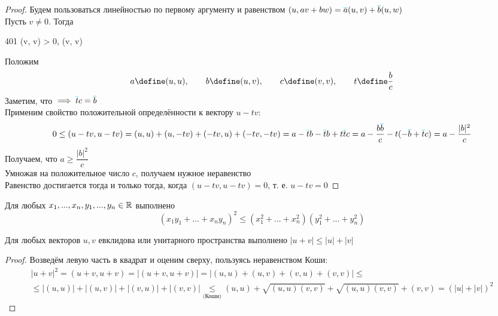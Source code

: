 \begin{proof}
	Будем пользоваться линейностью по первому аргументу и равенством $ (u, av + bw) = \color{cyan}\overline{\color{black}a}\color{black}(u, v) + \color{cyan}\overline{\color{black}b}\color{black}(u, w) $ \\
	Пусть $ v \ne 0 $. Тогда
	\begin{equ}{401}
		(v, v) > 0, \qquad (v, v) \in \R
	\end{equ}
	Положим
	$$ a \define (u, u), \qquad b \define (u, v), \qquad c \define (v, v), \qquad t \define \frac{b}{c} $$
	Заметим, что  $ \implies \color{cyan}\overline{\color{black}t}\color{black}c = \color{cyan}\overline{\color{black}b}\color{black} $ \\
	Применим свойство положительной определённости к вектору $ u - tv $:
	$$ 0 \le (u - tv, u - tv) = (u, u) + (u, -tv) + (-tv, u) + (-tv, -tv) = a - \color{cyan}\overline{\color{black}t}\color{black}b - \color{cyan}\overline{\color{black}t}\color{black}b + t\color{cyan}\overline{\color{black}t}\color{black}c = a - \frac{b\color{cyan}\overline{\color{black}b}\color{black}}c - t(-\color{cyan}\overline{\color{black}b}\color{black} + \color{cyan}\overline{\color{black}t}\color{black}c) = a - \frac{|b|^2}c $$
	Получаем, что $ a \ge \dfrac{|b|^2}c $ \\
	Умножая на положительное число $ c $, получаем нужное неравенство \\
	Равенство достигается тогда и только тогда, когда $ (u - tv, u - tv) = 0 $, т. е. $ u - tv = 0 $
\end{proof}

\begin{implication}
	Для любых $ x_1, ..., x_n, y_1, ..., y_n \in \mathbb{R} $ выполнено
	$$ (x_1y_1 + ... + x_ny_n)^2 \le (x_1^2 + ... + x_n^2)(y_1^2 + ... + y_n^2) $$
\end{implication}

\begin{implication}
	Для любых векторов $ u, v $ евклидова или унитарного пространства выполнено $ |u + v| \le |u| + |v| $
\end{implication}

\begin{proof}
	Возведём левую часть в квадрат и оценим сверху, пользуясь неравенством Коши:
	\begin{multline*}
		|u + v|^2 = (u + v, u + v) = |(u + v, u + v)| = |(u, u) + (u, v) + (v, u) + (v, v)| \le \\
		\le |(u, u)| + |(u, v)| + |(v, u)| + |(v, v)| \underset{\text{(Коши)}}\le (u, u) + \sqrt{(u, u)(v, v)} + \sqrt{(u, u)(v, v)} + (v, v) = (|u| + |v|)^2
	\end{multline*}
\end{proof}

